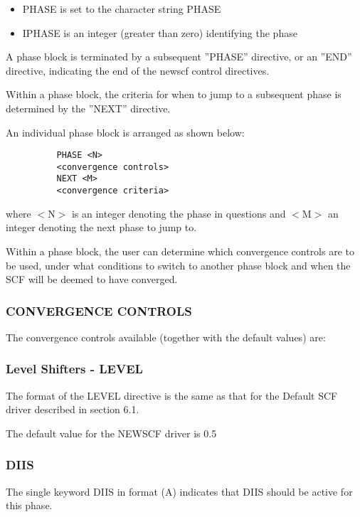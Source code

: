 \documentclass[11pt,fleqn]{article}
\begin{document}
\begin{itemize}
\item PHASE is set to the character string PHASE
\item IPHASE is an integer (greater than zero) identifying the phase
\end{itemize}

A phase block is terminated by a subsequent ''PHASE'' directive, or an
''END'' directive, indicating the end of the newscf control
directives.

Within a phase block, the criteria for when to jump to a subsequent
phase is determined by the ''NEXT'' directive.

An individual phase block is arranged as shown below:

{
\footnotesize
\begin{verbatim}
          PHASE <N>
          <convergence controls>
          NEXT <M>
          <convergence criteria>
\end{verbatim}
}

where $<$N$>$ is an integer denoting the phase in questions and $<$M$>$ an
integer denoting the next phase to jump to.

Within a phase block, the user can determine which convergence
controls are to be used, under what conditions to switch to another
phase block and when the SCF will be deemed to have converged.

\subsubsection[CONVERGENCE CONTROLS]{CONVERGENCE CONTROLS}
The convergence controls available (together with the default values) are:

\subsubsection[Level Shifters - LEVEL]{Level Shifters - LEVEL}
The format of the LEVEL directive is the same as that for the Default
SCF driver described in section 6.1.

The default value for the NEWSCF driver is 0.5

\subsubsection[DIIS]{DIIS}
The single keyword DIIS in format (A) indicates that DIIS should be
active for this phase. 
\end{document}
